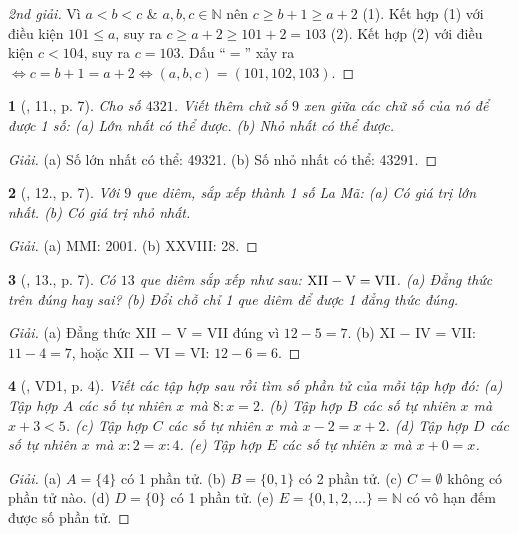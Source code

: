 \documentclass{article}
\newtheorem{baitoan}{}
\begin{document}
\begin{proof}[2nd giải]
	Vì $a < b < c$ \& $a,b,c\in\mathbb{N}$ nên $c\ge b + 1\ge a + 2$ (1). Kết hợp (1) với điều kiện $101\le a$, suy ra $c\ge a + 2\ge101 + 2 = 103$ (2). Kết hợp (2) với điều kiện $c < 104$, suy ra $c = 103$. Dấu ``$=$'' xảy ra $\Leftrightarrow c = b + 1 = a + 2\Leftrightarrow(a,b,c) = (101,102,103)$.
\end{proof}

\begin{baitoan}[\cite{Tuyen_Toan_6}, 11., p. 7]
	Cho số $4321$. Viết thêm chữ số $9$ xen giữa các chữ số của nó để được 1 số: (a) Lớn nhất có thể được. (b) Nhỏ nhất có thể được.
\end{baitoan}

\begin{proof}[Giải]
	(a) Số lớn nhất có thể: 49321. (b) Số nhỏ nhất có thể: 43291.
\end{proof}

\begin{baitoan}[\cite{Tuyen_Toan_6}, 12., p. 7]
	Với $9$ que diêm, sắp xếp thành 1 số La Mã: (a) Có giá trị lớn nhất. (b) Có giá trị nhỏ nhất.
\end{baitoan}

\begin{proof}[Giải]
	(a) MMI: 2001. (b) XXVIII: 28.
\end{proof}

\begin{baitoan}[\cite{Tuyen_Toan_6}, 13., p. 7]
	Có $13$ que diêm sắp xếp như sau: $\rm XII - V = VII$. (a) Đẳng thức trên đúng hay sai? (b) Đổi chỗ chỉ 1 que diêm để được 1 đẳng thức đúng.
\end{baitoan}

\begin{proof}[Giải]
	(a) Đẳng thức XII $-$ V = VII đúng vì $12 - 5 = 7$. (b) XI $-$ IV = VII: $11 - 4 = 7$, hoặc XII $-$ VI = VI: $12 - 6 = 6$.
\end{proof}

\begin{baitoan}[\cite{Binh_Toan_6_tap_1}, VD1, p. 4]
	Viết các tập hợp sau rồi tìm số phần tử của mỗi tập hợp đó: (a) Tập hợp $A$ các số tự nhiên $x$ mà $8:x = 2$. (b) Tập hợp $B$ các số tự nhiên $x$ mà $x + 3 < 5$. (c) Tập hợp $C$ các số tự nhiên $x$ mà $x - 2 = x + 2$. (d) Tập hợp $D$ các số tự nhiên $x$ mà $x:2 = x:4$. (e) Tập hợp $E$ các số tự nhiên $x$ mà $x + 0 = x$.
\end{baitoan}

\begin{proof}[Giải]
	(a) $A = \{4\}$ có 1 phần tử. (b) $B = \{0,1\}$ có 2 phần tử. (c) $C = \emptyset$ không có phần tử nào. (d) $D = \{0\}$ có 1 phần tử. (e) $E = \{0,1,2,\ldots\} = \mathbb{N}$ có vô hạn đếm được số phần tử.
\end{proof}
\end{document}
